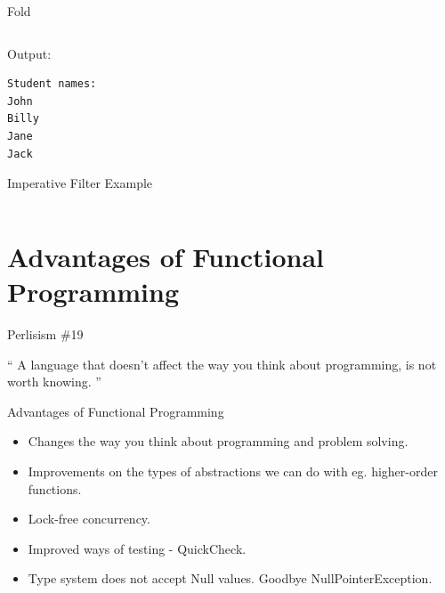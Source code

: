 \documentclass{beamer}
\begin{document}
\begin{frame}[fragile]{Fold}

  \inputminted[firstline=10,lastline=13]{haskell}{code/studentfold.hs}

  \vskip5mm

Output:
  \begin{verbatim}
Student names:
John
Billy
Jane
Jack
  \end{verbatim}

\end{frame}


\begin{frame}{Imperative Filter Example}

  \inputminted[firstline=3,lastline=17]{python}{code/studentfilter.py}

\end{frame}

\section{Advantages of Functional Programming}

\begin{frame}{Perlisism \#19}

\begin{exampleblock}{}
  {\Large ``
    A language that doesn't affect the way you think about programming, is not worth knowing.
  ''}
  \vskip5mm
  \hspace*{}
\end{exampleblock}

\end{frame}

\begin{frame}{Advantages of Functional Programming}

  \begin{itemize}[<+->]
  \item Changes the way you think about programming and problem solving.
  \item Improvements on the types of abstractions we can do with eg.
    higher-order functions.
  \item Lock-free concurrency.
  \item Improved ways of testing - QuickCheck.
  \item Type system does not accept Null values. Goodbye NullPointerException.
  \end{itemize}

\end{frame}
\end{document}
